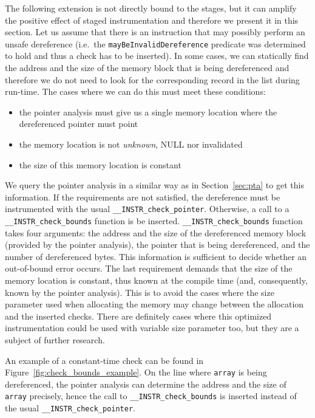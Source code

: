 The following extension is not directly bound to the stages, but it
can amplify the positive effect of staged instrumentation and
therefore we present it in this section. Let us assume that there is
an instruction that may possibly perform an unsafe dereference
(i.e.~the \texttt{mayBeInvalidDereference} predicate was determined to
hold and thus a check has to be inserted). In some cases, we can
statically find the address and the size of the memory block that is
being dereferenced and therefore we do not need to look for the
corresponding record in the list during run-time. The cases where we
can do this must meet these conditions:
\begin{itemize}
\item the pointer analysis must give us a single memory location where the
dereferenced pointer must point
\item the memory location is not \emph{unknown}, NULL nor invalidated
\item the size of this memory location is constant
\end{itemize}

We query the pointer analysis in a similar way as in
Section~\ref{sec:pta} to get this information.  If the requirements
are not satisfied, the dereference must be instrumented with the usual
\texttt{\_\_INSTR\_check\_pointer}. Otherwise, a call to a
\texttt{\_\_INSTR\_check\_bounds} function is be
inserted. \texttt{\_\_INSTR\_check\_bounds} function takes four
arguments: the address and the size of the dereferenced memory block
(provided by the pointer analysis), the pointer that is being
dereferenced, and the number of dereferenced bytes.  This information
is sufficient to decide whether an out-of-bound error occurs.  The
last requirement demands that the size of the memory location is
constant, thus known at the compile time (and, consequently, known by
the pointer analysis).  This is to avoid the cases where the size
parameter used when allocating the memory may change between the
allocation and the inserted checks.  There are definitely cases where
this optimized instrumentation could be used with variable size
parameter too, but they are a subject of further research.

An example of a constant-time check can be found in
Figure~\ref{fig:check_bounds_example}.  On the line where
\texttt{array} is being dereferenced, the pointer analysis can
determine the address and the size of \texttt{array} precisely, hence
the call to \texttt{\_\_INSTR\_check\_bounds} is inserted instead of
the usual \texttt{\_\_INSTR\_check\_pointer}.

